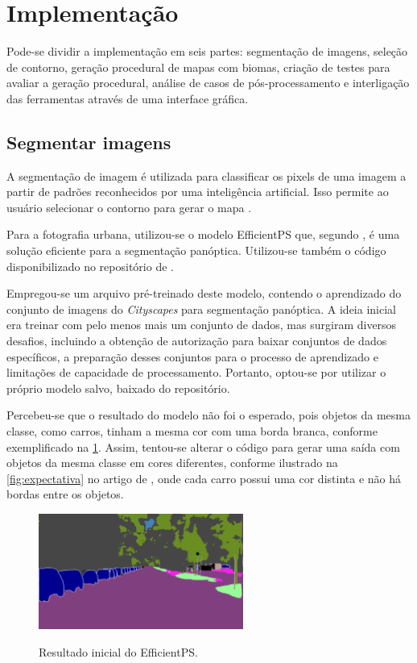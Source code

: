 \section{Implementação}

Pode-se dividir a implementação em seis partes: segmentação de imagens, seleção de contorno, geração procedural de mapas com biomas, criação de testes para avaliar a geração procedural, análise de casos de pós-processamento e interligação das ferramentas através de uma interface gráfica.

\subsection{Segmentar imagens}

A segmentação de imagem é utilizada para classificar os pixels de uma imagem a partir de padrões reconhecidos por uma inteligência artificial. Isso permite ao usuário selecionar o contorno para gerar o mapa \cite{dp_semantic_segmantation, lapix}.

Para a fotografia urbana, utilizou-se o modelo EfficientPS que, segundo , é uma solução eficiente para a segmentação panóptica. Utilizou-se também o código disponibilizado no repositório de .

Empregou-se um arquivo pré-treinado deste modelo, contendo o aprendizado do conjunto de imagens do \textit{Cityscapes} para segmentação panóptica. A ideia inicial era treinar com pelo menos mais um conjunto de dados, mas surgiram diversos desafios, incluindo a obtenção de autorização para baixar conjuntos de dados específicos, a preparação desses conjuntos para o processo de aprendizado e limitações de capacidade de processamento. Portanto, optou-se por utilizar o próprio modelo salvo, baixado do repositório.

Percebeu-se que o resultado do modelo não foi o esperado, pois objetos da mesma classe, como carros, tinham a mesma cor com uma borda branca, conforme exemplificado na \cref{fig:resultado_inicial}. Assim, tentou-se alterar o código para gerar uma saída com objetos da mesma classe em cores diferentes, conforme ilustrado na \cref{fig:expectativa} no artigo de , onde cada carro possui uma cor distinta e não há bordas entre os objetos.

\begin{figure}[!ht]
\centering
\caption{Resultado inicial do EfficientPS.}
\includegraphics[width=0.6\textwidth]{figures/resultado_primario.png}
\label{fig:resultado_inicial}
\end{figure}

